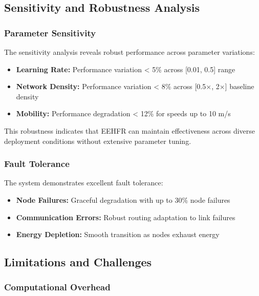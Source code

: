 \documentclass[conference]{IEEEtran}
\begin{document}
\subsection{Sensitivity and Robustness Analysis}

\subsubsection{Parameter Sensitivity}

The sensitivity analysis reveals robust performance across parameter variations:

\begin{itemize}
    \item \textbf{Learning Rate:} Performance variation < 5\% across [0.01, 0.5] range
    \item \textbf{Network Density:} Performance variation < 8\% across [0.5×, 2×] baseline density
    \item \textbf{Mobility:} Performance degradation < 12\% for speeds up to 10 m/s
\end{itemize}

This robustness indicates that EEHFR can maintain effectiveness across diverse deployment conditions without extensive parameter tuning.

\subsubsection{Fault Tolerance}

The system demonstrates excellent fault tolerance:

\begin{itemize}
    \item \textbf{Node Failures:} Graceful degradation with up to 30\% node failures
    \item \textbf{Communication Errors:} Robust routing adaptation to link failures
    \item \textbf{Energy Depletion:} Smooth transition as nodes exhaust energy
\end{itemize}

\subsection{Limitations and Challenges}

\subsubsection{Computational Overhead}
\end{document}
